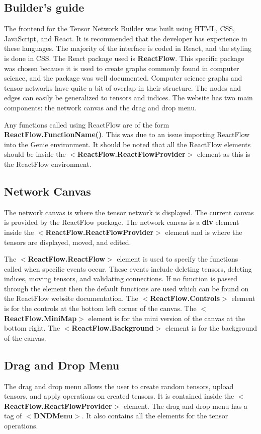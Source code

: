 \documentclass{juliacon}
\begin{document}
\begin{appendix}
\section{Builder's guide}
The frontend for the Tensor Network Builder was built using HTML, CSS, JavaScript, and React. It is recommended that the developer has experience in these languages. The majority of the interface is coded in React, and the styling is done in CSS. The React package used is \textbf{ReactFlow}. This specific package was chosen because it is used to create graphs commonly found in computer science, and the package was well documented. Computer science graphs and tensor networks have quite a bit of overlap in their structure. The nodes and edges can easily be generalized to tensors and indices. The website has two main components: the network canvas and the drag and drop menu.

Any functions called using ReactFlow are of the form \textbf{ReactFlow.FunctionName()}. This was due to an issue importing ReactFlow into the Genie environment. It should be noted that all the ReactFlow elements should be inside the $<$\textbf{ReactFlow.ReactFlowProvider}$>$ element as this is the ReactFlow environment. 

\subsection{Network Canvas}

The network canvas is where the tensor network is displayed. The current canvas is provided by the ReactFlow package. The network canvas is a \textbf{div} element inside the $<$\textbf{ReactFlow.ReactFlowProvider}$>$ element and is where the tensors are displayed, moved, and edited.

The $<$\textbf{ReactFlow.ReactFlow}$>$ element is used to specify the functions called when specific events occur. These events include deleting tensors, deleting indices, moving tensors, and validating connections. If no function is passed through the element then the default functions are used which can be found on the ReactFlow website documentation. The $<$\textbf{ReactFlow.Controls}$>$ element is for the controls at the bottom left corner of the canvas. The $<$\textbf{ReactFlow.MiniMap}$>$ element is for the mini version of the canvas at the bottom right. The $<$\textbf{ReactFlow.Background}$>$ element is for the background of the canvas.


\subsection{Drag and Drop Menu}
The drag and drop menu allows the user to create random tensors, upload tensors, and apply operations on created tensors. It is contained inside the $<$\textbf{ReactFlow.ReactFlowProvider}$>$ element. The drag and drop menu has a tag of $<$\textbf{DNDMenu}$>$. It also contains all the elements for the tensor operations.


\end{appendix}
\end{document}
